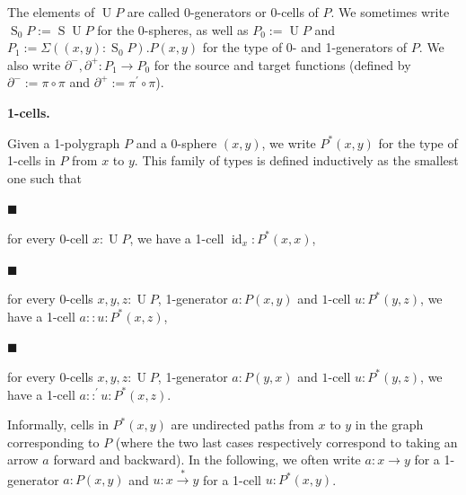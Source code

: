  
The elements of $\operatorname{U}P$ are called 0-generators or 0-cells of $P$. We sometimes write $\operatorname{S}_{0}P:=\operatorname{S}\operatorname{U}P$ for the 0-spheres, as well as $P_{0}:=\operatorname{U}P$ and $P_{1}:=\Sigma((x,y):\operatorname{S}_{0}P).P(x,y)$ for the type of 0- and 1-generators of $P$. We also write $\partial^{-},\partial^{+}:P_{1}\to P_{0}$ for the source and target functions (defined by $\partial^{-}:=\pi\circ\pi$ and $\partial^{+}:=\pi^{\prime}\circ\pi$).\par
 
 
 
 
\par\medskip\noindent\textbf{1-cells.}\par
 
 
Given a 1-polygraph $P$ and a $0$-sphere $(x,y)$, we write $P^{*}(x,y)$ for the type of 1-cells in $P$ from $x$ to $y$. This family of types is defined inductively as the smallest one such that\par
  
\par\noindent  $\blacksquare$ 
 
for every 0-cell $x:\operatorname{U}P$, we have a 1-cell $\operatorname{id}_{x}:P^{*}(x,x)$,\par
 
 
 
\par\noindent  $\blacksquare$ 
 
for every 0-cells $x,y,z:\operatorname{U}P$, 1-generator $a:P(x,y)$ and $1$-cell $u:P^{*}(y,z)$, we have a 1-cell $a::u:P^{*}(x,z)$,\par
 
 
 
\par\noindent  $\blacksquare$ 
 
for every 0-cells $x,y,z:\operatorname{U}P$, 1-generator $a:P(y,x)$ and $1$-cell $u:P^{*}(y,z)$, we have a 1-cell $a::^{\prime}u:P^{*}(x,z)$.\par
 
 
  
Informally, cells in $P^{*}(x,y)$ are undirected paths from $x$ to $y$ in the graph corresponding to $P$ (where the two last cases respectively correspond to taking an arrow $a$ forward and backward). In the following, we often write $a:x\to y$ for a 1-generator $a:P(x,y)$ and $u:x\overset{*}{\to}y$ for a 1-cell $u:P^{*}(x,y)$.\par
 

